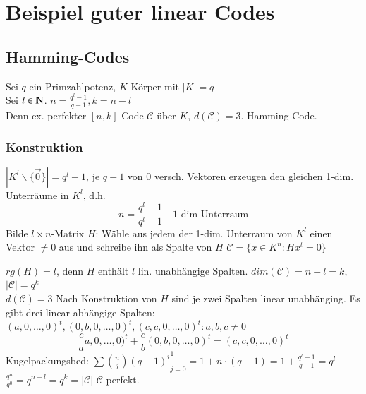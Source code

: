 \section{Beispiel guter linear Codes}
\subsection{Hamming-Codes}
Sei $q$ ein Primzahlpotenz, $K$ K\"orper mit $\left| K \right| = q$\\
Sei $l \in  \N$. $n=\frac{q^l-1}{q-1}, k=n-l$  \\
Denn ex. perfekter $[n,k]$-Code $\mathcal{C}$ \"uber $K$, $d(\mathcal{C})=3$.
Hamming-Code.
\subsubsection{Konstruktion}
$\left| K^l \backslash \lbrace \vec{0} \rbrace \right| = q^l -1$, je $q-1$ von $0$ versch. Vektoren erzeugen den gleichen 1-dim. Unterr\"aume in $K^l$, d.h.
\[
	n = \frac{q^l-1}{q^l-1} \quad \text{1-dim Unterraum}
\]
Bilde $l\times n$-Matrix $H$: W\"ahle aus jedem der 1-dim. Unterraum von $K^l$ einen Vektor $\neq 0$ aus und schreibe ihn als Spalte von $H$
$\mathcal{C} = \lbrace x \in K^n : Hx^t=0 \rbrace$

%
% 

$rg(H)=l$, denn $H$ enth\"alt $l$ lin. unabh\"angige Spalten.	$dim(\mathcal{C})=n-l=k$, $\left| \mathcal{C} \right | = q^k$ \\
$d(\mathcal{C})=3$ Nach Konstruktion von $H$ sind je zwei Spalten linear unabh\"anging. Es gibt drei linear abh\"angige Spalten: $(a,0,\ldots,0)^t,(0,b,0,\ldots,0)^t, (c,c,0,\ldots,0)^t : a,b,c \neq 0$
\[
	\frac{c}{a} a,0,\ldots,0)^t + \frac{c}{b} (0,b,0,\ldots,0)^t = (c,c,0,\ldots,0)^t
\]
Kugelpackungsbed:	
$\sum{\binom{n}{j} (q-1)^i}_{j=0}^1=1 + n \cdot (q-1) = 1 + \frac{q^l-1}{q-1}=q^l$\\
$\frac{q^n}{q^0}=q^{n-l}=q^k = \left| \mathcal{C} \right|$
$\mathcal{C}$ perfekt.